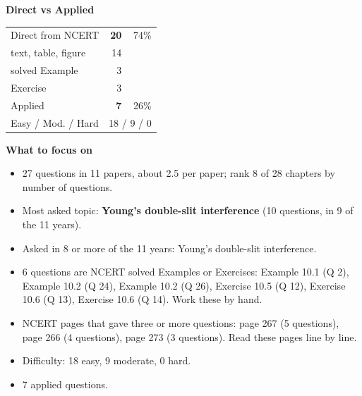 \begin{minipage}[t]{0.34\linewidth}{\small\textbf{\color{crimson}Direct vs Applied}\par\smallskip
\begin{tabular}{@{}lrr@{}}\toprule
Direct from NCERT & \textbf{20} & 74\%\\
\quad text, table, figure & 14 &\\
\quad solved Example & 3 &\\
\quad Exercise & 3 &\\
Applied & \textbf{7} & 26\%\\\midrule
Easy / Mod. / Hard & \multicolumn{2}{r}{18 / 9 / 0}\\\bottomrule
\end{tabular}}\end{minipage}\hfill
\begin{minipage}[t]{0.63\linewidth}{\small\textbf{\color{crimson}What to focus on}\par\smallskip
\begin{itemize}[leftmargin=1.1em,itemsep=1pt,topsep=0pt]
\item 27 questions in 11 papers, about 2.5 per paper; rank 8 of 28 chapters by number of questions.
\item Most asked topic: \textbf{Young's double-slit interference} (10 questions, in 9 of the 11 years).
\item Asked in 8 or more of the 11 years: Young's double-slit interference.
\item 6 questions are NCERT solved Examples or Exercises: Example 10.1 (Q 2), Example 10.2 (Q 24), Example 10.2 (Q 26), Exercise 10.5 (Q 12), Exercise 10.6 (Q 13), Exercise 10.6 (Q 14). Work these by hand.
\item NCERT pages that gave three or more questions: page 267 (5 questions), page 266 (4 questions), page 273 (3 questions). Read these pages line by line.
\item Difficulty: 18 easy, 9 moderate, 0 hard.
\item 7 applied questions.
\end{itemize}}\end{minipage}\par
{}
